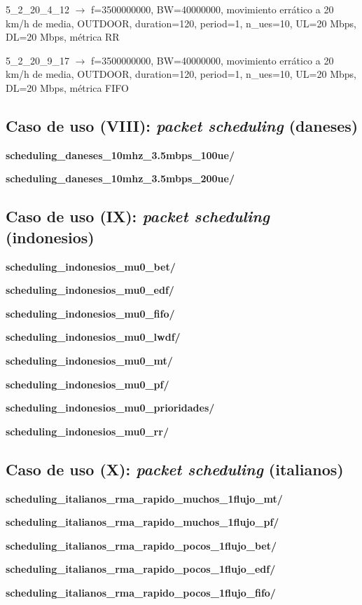 \documentclass[12pt]{report} %
\begin{document}
5\_2\_20\_4\_12 $\rightarrow$ f=3500000000, BW=40000000, movimiento errático a 20 km/h de media, OUTDOOR, duration=120, period=1, n\_ues=10, UL=20 Mbps, DL=20 Mbps, métrica RR

5\_2\_20\_9\_17 $\rightarrow$ f=3500000000, BW=40000000, movimiento errático a 20 km/h de media, OUTDOOR, duration=120, period=1, n\_ues=10, UL=20 Mbps, DL=20 Mbps, métrica FIFO

\subsection* {Caso de uso (VIII): \textit{packet scheduling} (daneses)}

\textbf{scheduling\_daneses\_10mhz\_3.5mbps\_100ue/}

\textbf{scheduling\_daneses\_10mhz\_3.5mbps\_200ue/}

\subsection* {Caso de uso (IX): \textit{packet scheduling} (indonesios)}

\textbf{scheduling\_indonesios\_mu0\_bet/}

\textbf{scheduling\_indonesios\_mu0\_edf/}

\textbf{scheduling\_indonesios\_mu0\_fifo/}

\textbf{scheduling\_indonesios\_mu0\_lwdf/}

\textbf{scheduling\_indonesios\_mu0\_mt/}

\textbf{scheduling\_indonesios\_mu0\_pf/}

\textbf{scheduling\_indonesios\_mu0\_prioridades/}

\textbf{scheduling\_indonesios\_mu0\_rr/}

\subsection* {Caso de uso (X): \textit{packet scheduling} (italianos)}

\textbf{scheduling\_italianos\_rma\_rapido\_muchos\_1flujo\_mt/}

\textbf{scheduling\_italianos\_rma\_rapido\_muchos\_1flujo\_pf/}

\textbf{scheduling\_italianos\_rma\_rapido\_pocos\_1flujo\_bet/}

\textbf{scheduling\_italianos\_rma\_rapido\_pocos\_1flujo\_edf/}

\textbf{scheduling\_italianos\_rma\_rapido\_pocos\_1flujo\_fifo/}
\end{document}
